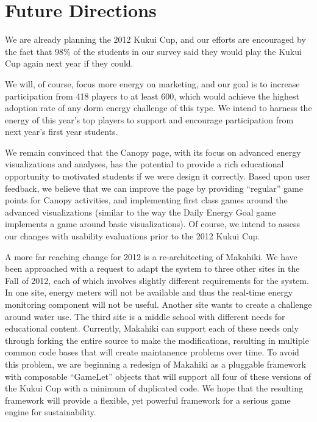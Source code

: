 \documentclass{acm_proc_article-sp}
\begin{document}
\section{Future Directions}

We are already planning the 2012 Kukui Cup, and our efforts are encouraged
by the fact that 98\% of the students in our survey said they would play
the Kukui Cup again next year if they could. 

We will, of course, focus more energy on marketing, and our goal is to
increase participation from 418 players to at least 600, which would
achieve the highest adoption rate of any dorm energy challenge of this
type.  We intend to harness the energy of this year's top players to
support and encourage participation from next year's first year students.

We remain convinced that the Canopy page, with its focus on advanced energy
visualizations and analyses, has the potential to provide a rich
educational opportunity to motivated students if we were design it
correctly.  Based upon user feedback, we believe that we can improve the
page by providing ``regular'' game points for Canopy activities, and
implementing first class games around the advanced visualizations (similar
to the way the Daily Energy Goal game implements a game around basic
visualizations).  Of course, we intend to assess our changes with usability
evaluations prior to the 2012 Kukui Cup.

A more far reaching change for 2012 is a re-architecting of Makahiki.  We
have been approached with a request to adapt the system to three other
sites in the Fall of 2012, each of which involves slightly different
requirements for the system. In one site, energy meters will not be
available and thus the real-time energy monitoring component will not be
useful. Another site wants to create a challenge around water use.  The
third site is a middle school with different needs for educational content.
Currently, Makahiki can support each of these needs only through forking
the entire source to make the modifications, resulting in multiple common
code bases that will create maintanence problems over time.  To avoid this
problem, we are beginning a redesign of Makahiki as a pluggable framework
with composable ``GameLet'' objects that will support all four of these versions of
the Kukui Cup with a minimum of duplicated code.  We hope that the
resulting framework will provide a flexible, yet powerful framework for a
serious game engine for sustainability.
\end{document}
